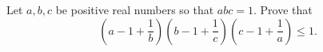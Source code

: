 Let $ a, b, c$ be positive real numbers so that $ abc = 1$. Prove that\[ \left( a - 1 + \frac 1b \right) \left( b - 1 + \frac 1c \right) \left( c - 1 + \frac 1a \right) \leq 1.
\]
